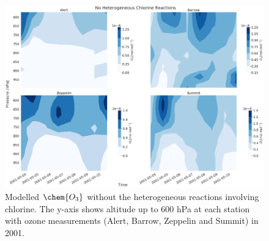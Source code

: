 \begin{figure}
    \centering
    \includegraphics[width = \linewidth]{Chapter6_Results/images/noCl_2001_o3.png}
    \caption{Modelled $\chem{O_3}$ without the heterogeneous reactions involving chlorine. The y-axis shows altitude up to 600 hPa at each station with ozone measurements (Alert, Barrow, Zeppelin and Summit) in 2001.}
    \label{fig:vert_noCl_o3_2001}
\end{figure}